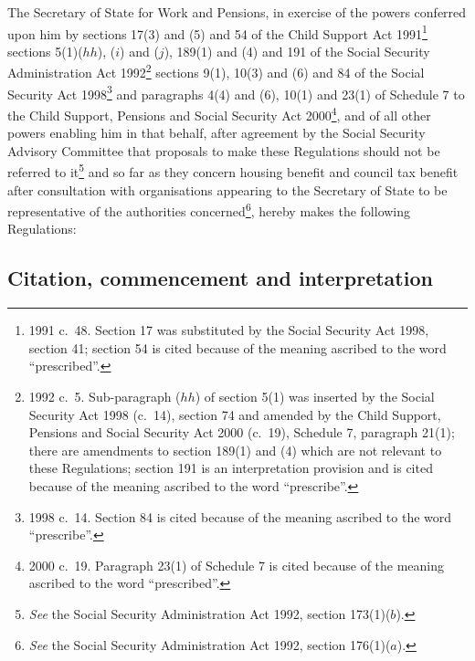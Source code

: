 \documentclass[12pt,a4paper]{article}
\title{\regstitle}
\author{S.I.\ 2003 No.\ 1050}
\date{Made
7th April 2003\\
Laid before Parliament
14th April 2003\\
Coming into force
in accordance with regulation 1(1)
}
\begin{document}
\maketitle

\noindent
The Secretary of State for Work and Pensions, in exercise of the powers conferred upon him by sections 17(3) and (5) and 54 of the Child Support Act 1991\footnote{1991 c.\ 48. Section 17 was substituted by the Social Security Act 1998, section 41; section 54 is cited because of the meaning ascribed to the word “prescribed”.} sections 5(1)($hh$), ($i$) and ($j$), 189(1) and (4) and 191 of the Social Security Administration Act 1992\footnote{1992 c.\ 5. Sub-paragraph ($hh$) of section 5(1) was inserted by the Social Security Act 1998 (c.\ 14), section 74 and amended by the Child Support, Pensions and Social Security Act 2000 (c.\ 19), Schedule 7, paragraph 21(1); there are amendments to section 189(1) and (4) which are not relevant to these Regulations; section 191 is an interpretation provision and is cited because of the meaning ascribed to the word “prescribe”.} sections 9(1), 10(3) and (6) and 84 of the Social Security Act 1998\footnote{1998 c.\ 14. Section 84 is cited because of the meaning ascribed to the word “prescribe”.} and paragraphs 4(4) and (6), 10(1) and 23(1) of Schedule 7 to the Child Support, Pensions and Social Security Act 2000\footnote{2000 c.\ 19. Paragraph 23(1) of Schedule 7 is cited because of the meaning ascribed to the word “prescribed”.}, and of all other powers enabling him in that behalf, after agreement by the Social Security Advisory Committee that proposals to make these Regulations should not be referred to it\footnote{\emph{See} the Social Security Administration Act 1992, section 173(1)($b$).} and so far as they concern housing benefit and council tax benefit after consultation with organisations appearing to the Secretary of State to be representative of the authorities concerned\footnote{\emph{See} the Social Security Administration Act 1992, section 176(1)($a$).}, hereby makes the following Regulations: 

{\sloppy

\tableofcontents

}

\bigskip

\setcounter{secnumdepth}{-2}

\subsection[1. Citation, commencement and interpretation]{Citation, commencement and interpretation}
\end{document}
